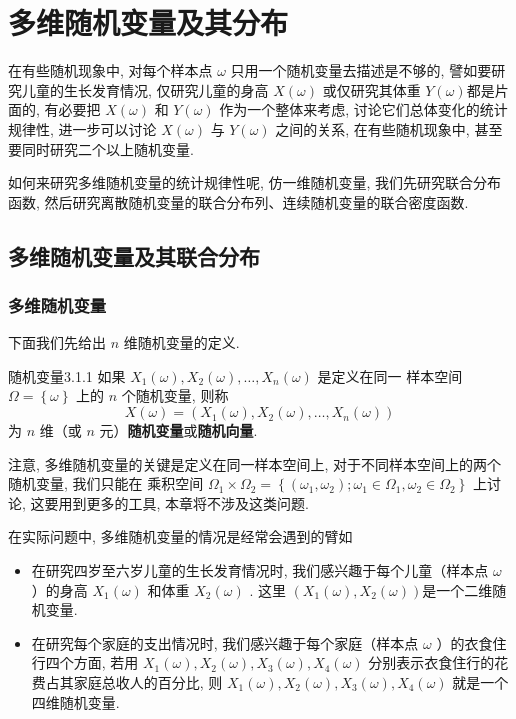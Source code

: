 \setlength{\abovedisplayskip}{5pt}
\setlength{\belowdisplayskip}{5pt}

\chapter{多维随机变量及其分布}\label{cha:3}
在有些随机现象中, 对每个样本点 $\omega$ 只用一个随机变量去描述是不够的, 
譬如要研究儿童的生长发育情况, 仅研究儿童的身高 $X(\omega)$ 或仅研究其体重 $Y(\omega)$都是片面的, 
有必要把 $X(\omega)$ 和 $Y(\omega)$ 作为一个整体来考虑, 讨论它们总体变化的统计规律性, 
进一步可以讨论 $X(\omega)$ 与 $Y(\omega)$ 之间的关系, 在有些随机现象中, 甚至要同时研究二个以上随机变量. 

如何来研究多维随机变量的统计规律性呢, 仿一维随机变量, 我们先研究联合分布函数, 
然后研究离散随机变量的联合分布列、连续随机变量的联合密度函数. 

\section{多维随机变量及其联合分布}\label{sec:3.1}

\subsection{多维随机变量}\label{ssec:3.1.1}
下面我们先给出 $n$ 维随机变量的定义. 
\begin{definition}{随机变量}{3.1.1}
	如果 $X_1(\omega),X_2(\omega),\ldots,X_n(\omega)$ 是定义在同一
	样本空间 $\Omega=\left\{\omega\right\}$ 上的 $n$ 个随机变量, 则称
	\[
	X(\omega)=(X_1(\omega),X_2(\omega),\ldots,X_n(\omega))
	\]
	为 $n$ 维（或 $n$ 元）\textbf{随机变量}或\textbf{随机向量}. 
\end{definition}
注意, 多维随机变量的关键是定义在同一样本空间上, 对于不同样本空间上的两个随机变量, 我们只能在
乘积空间 $\Omega_1\times \Omega_2=\left\{(\omega_1,\omega_2);\omega_1 \in \Omega_1,\omega_2 \in \Omega_2 \right\}$ 上讨论, 
 这要用到更多的工具, 本章将不涉及这类问题. 
      
 在实际问题中, 多维随机变量的情况是经常会遇到的臂如
  \begin{itemize}
  	\item 在研究四岁至六岁儿童的生长发育情况时, 我们感兴趣于每个儿童（样本点 $\omega$ ）的身高 $X_1(\omega)$ 
  	和体重 $X_2(\omega)$ . 这里 $(X_1(\omega),X_2(\omega))$是一个二维随机变量. 
  	\item 在研究每个家庭的支出情况时, 我们感兴趣于每个家庭（样本点 $\omega$ ）的衣食住行四个方面, 
  	若用 $X_1(\omega),X_2(\omega),X_3(\omega),X_4(\omega)$ 分别表示衣食住行的花费占其家庭总收人的百分比, 
  	则 $X_1(\omega),X_2(\omega),X_3(\omega),X_4(\omega)$ 就是一个四维随机变量. 
  \end{itemize}

